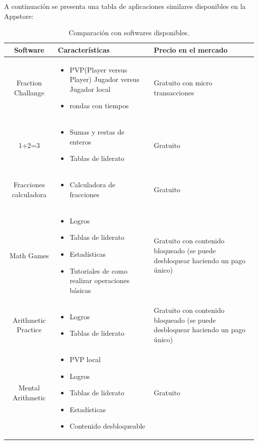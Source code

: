 \documentclass{article}
\begin{document}
A continuación se presenta una tabla de aplicaciones similares disponibles en la Appstore:

\begin{table}[H]
\caption{Comparación con softwares disponibles.}
\centering
\begin{tabular}{|c|M{6cm}|M{5cm}|}
\hline
Software & Características & Precio en el mercado \\ \hline

Fraction Challange & 
\begin{itemize}
	\item PVP(Player versus Player) Jugador versus Jugador local
	\item rondas con tiempos
\end{itemize} & 
Gratuito con micro transacciones \\ \hline


1+2=3 & 
\begin{itemize}
	\item Sumas y restas de enteros
	\item Tablas de liderato 
\end{itemize}& 
Gratuito \\ \hline


Fracciones calculadora & 
\begin{itemize}
	\item Calculadora de fracciones
\end{itemize}& 
Gratuito \\ \hline


Math Games & 
\begin{itemize}
	\item Logros
	\item Tablas de liderato
	\item Estadísticas
	\item Tutoriales de como realizar operaciones básicas
\end{itemize} & 
Gratuito con contenido bloqueado (se puede desbloquear haciendo un pago único) \\ \hline

Arithmetic Practice & 
\begin{itemize}
	\item Logros
	\item Tablas de liderato
\end{itemize} & 
Gratuito con contenido bloqueado (se puede desbloquear haciendo un pago único) \\ \hline


Mental Arithmetic  & 
\begin{itemize}
	\item PVP local
	\item Logros
	\item Tablas de liderato
	\item Estadísticas
	\item Contenido desbloqueable
\end{itemize} & 
Gratuito \\ \hline

\end{tabular}
\label{tab:software}
\end{table}
\end{document}
